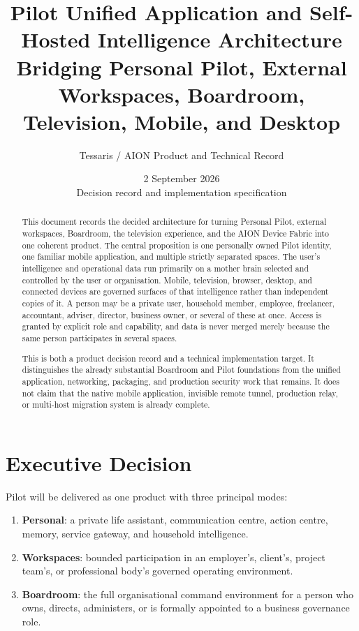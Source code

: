 \documentclass[11pt,a4paper]{article}
\title{\textbf{Pilot Unified Application and Self-Hosted Intelligence Architecture}\\[5pt]
\large Bridging Personal Pilot, External Workspaces, Boardroom, Television, Mobile, and Desktop}
\author{Tessaris / AION Product and Technical Record}
\date{2 September 2026\\Decision record and implementation specification}
\newcommand{\term}[1]{\textbf{#1}}
\begin{document}
\maketitle

\begin{abstract}
This document records the decided architecture for turning Personal Pilot,
external workspaces, Boardroom, the television experience, and the AION Device
Fabric into one coherent product.  The central proposition is one personally
owned Pilot identity, one familiar mobile application, and multiple strictly
separated spaces.  The user's intelligence and operational data run primarily
on a mother brain selected and controlled by the user or organisation.  Mobile,
television, browser, desktop, and connected devices are governed surfaces of
that intelligence rather than independent copies of it.  A person may be a
private user, household member, employee, freelancer, accountant, adviser,
director, business owner, or several of these at once.  Access is granted by
explicit role and capability, and data is never merged merely because the same
person participates in several spaces.

This is both a product decision record and a technical implementation target.
It distinguishes the already substantial Boardroom and Pilot foundations from
the unified application, networking, packaging, and production security work
that remains.  It does not claim that the native mobile application, invisible
remote tunnel, production relay, or multi-host migration system is already
complete.
\end{abstract}

\newpage
\tableofcontents
\newpage

\section{Executive Decision}

Pilot will be delivered as one product with three principal modes:

\begin{enumerate}[leftmargin=*]
  \item \term{Personal}: a private life assistant, communication centre,
        action centre, memory, service gateway, and household intelligence.
  \item \term{Workspaces}: bounded participation in an employer's, client's,
        project team's, or professional body's governed operating environment.
  \item \term{Boardroom}: the full organisational command environment for a
        person who owns, directs, administers, or is formally appointed to a
        business governance role.
\end{enumerate}
\end{document}
